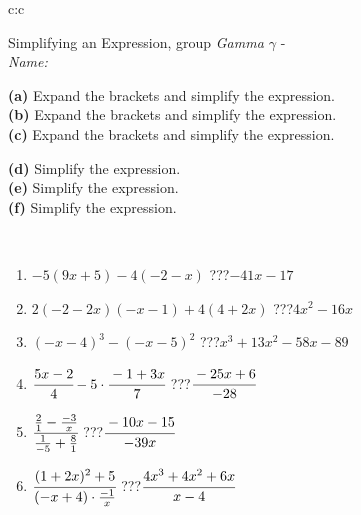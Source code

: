 \documentclass[10pt]{report}
\begin{document}
\newpage
\thispagestyle{empty}
\begin{tabular}{c:c}
\begin{minipage}[c][104.5mm][t]{0.5\linewidth}
\begin{center}
\vspace{7mm}
{\huge Simplifying an Expression, group \textit{Gamma $\gamma$} -}\\[5mm]
\textit{Name:}\phantom{xxxxxxxxxxxxxxxxxxxxxxxxxxxxxxxxxxxxxxxxxxxxxxxxxxxxxxxxxxxxxxxxx}\\[5mm]
\begin{minipage}{0.95\linewidth}
\begin{center}
{\small \begin{minipage}{0.6\textwidth}
\textbf{(a)} Expand the brackets and simplify the expression. \\[1mm]
\textbf{(b)} Expand the brackets and simplify the expression. \\[1mm]
\textbf{(c)} Expand the brackets and simplify the expression.
\end{minipage} \begin{minipage}{0.39\textwidth}
\textbf{(d)} Simplify the expression. \\[1mm]
\textbf{(e)} Simplify the expression. \\[1mm]
\textbf{(f)} Simplify the expression.
\end{minipage}
}
\end{center}
\end{minipage}
\\[4mm]
\begin{minipage}{0.79\linewidth}
\begin{center}
\begin{varwidth}{\linewidth}
\begin{enumerate}
\normalsize
\item $-5(9x+5)-4(-2-x)$\quad \dotfill\; ???\;\dotfill \quad $-41x-17$
\item $2(-2-2x)(-x-1)+4(4+2x)$\quad \dotfill\; ???\;\dotfill \quad $4x^2-16x$
\item $(-x-4)^3-(-x-5)^2$\quad \dotfill\; ???\;\dotfill \quad $x^3+13x^2-58x-89$
\item $\cfrac{5x-2}{4}-5\cdot\cfrac{-1+3x}{7}$\quad \dotfill\; ???\;\dotfill \quad $\cfrac{-25x+6}{-28}$
\item $\cfrac{\frac{2}{1}-\frac{-3}{x}}{\frac{1}{-5}+\frac{8}{1}}$\quad \dotfill\; ???\;\dotfill \quad $\cfrac{-10x-15}{-39x}$
\item $\cfrac{(1+2x)^2+5}{(-x+4)\cdot\frac{-1}{x}}$\quad \dotfill\; ???\;\dotfill \quad $\cfrac{4x^3+4x^2+6x}{x-4}$

\end{enumerate}
\end{varwidth}
\end{center}
\end{minipage}
\end{center}
\end{minipage}
\end{tabular}
\end{document}
